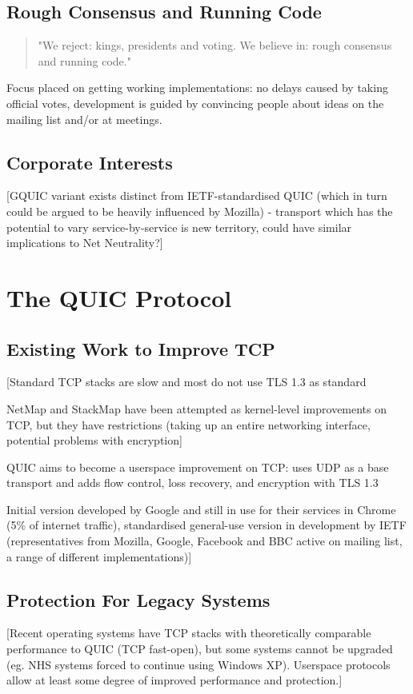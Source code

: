 \documentclass{l4proj}
\begin{document}
\section{Rough Consensus and Running Code}
\begin{quotation}
"We reject: kings, presidents and voting. We believe in: rough consensus and running code."
\end{quotation}

Focus placed on getting working implementations: no delays caused by taking official votes, development is guided by convincing people about ideas on the mailing list and/or at meetings.

\section{Corporate Interests}
[GQUIC variant exists distinct from IETF-standardised QUIC (which in turn could be argued to be heavily influenced by Mozilla) - transport which has the potential to vary service-by-service is new territory, could have similar implications to Net Neutrality?]


\pagebreak


\chapter{The QUIC Protocol}

\section{Existing Work to Improve TCP}
[Standard TCP stacks are slow and most do not use TLS 1.3 as standard

NetMap and StackMap have been attempted as kernel-level improvements on TCP, but they have restrictions (taking up an entire networking interface, potential problems with encryption]

QUIC aims to become a userspace improvement on TCP: uses UDP as a base transport and adds flow control, loss recovery, and encryption with TLS 1.3

Initial version developed by Google and still in use for their services in Chrome (5\% of internet traffic), standardised general-use version in development by IETF (representatives from Mozilla, Google, Facebook and BBC active on mailing list, a range of different implementations)]

\section{Protection For Legacy Systems}
[Recent operating systems have TCP stacks with theoretically comparable performance to QUIC (TCP fast-open), but some systems cannot be upgraded (eg. NHS systems forced to continue using Windows XP). Userspace protocols allow at least some degree of improved performance and protection.]
\end{document}
